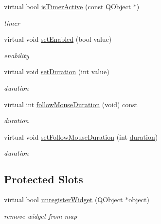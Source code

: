 \begin{DoxyCompactItemize}
virtual bool \hyperlink{class_tool_bar_engine_af5a2dccf626356ea8eb9d330dbc07467}{is\+Timer\+Active} (const Q\+Object $\ast$)
\begin{DoxyCompactList}\small\item\em timer \end{DoxyCompactList}\item 
\mbox{\label{class_tool_bar_engine_aef4318429c79f5d599f8decf6ffac98e}} 
virtual void \hyperlink{class_tool_bar_engine_aef4318429c79f5d599f8decf6ffac98e}{set\+Enabled} (bool value)
\begin{DoxyCompactList}\small\item\em enability \end{DoxyCompactList}\item 
\mbox{\label{class_tool_bar_engine_a6030eccbb0e396b4fe258be5b4b0a49f}} 
virtual void \hyperlink{class_tool_bar_engine_a6030eccbb0e396b4fe258be5b4b0a49f}{set\+Duration} (int value)
\begin{DoxyCompactList}\small\item\em duration \end{DoxyCompactList}\item 
\mbox{\label{class_tool_bar_engine_a4a3614fc5ce38e90ff90267070558657}} 
virtual int \hyperlink{class_tool_bar_engine_a4a3614fc5ce38e90ff90267070558657}{follow\+Mouse\+Duration} (void) const
\begin{DoxyCompactList}\small\item\em duration \end{DoxyCompactList}\item 
\mbox{\label{class_tool_bar_engine_a071558684d3a7bb791599dce2f6063b2}} 
virtual void \hyperlink{class_tool_bar_engine_a071558684d3a7bb791599dce2f6063b2}{set\+Follow\+Mouse\+Duration} (int \hyperlink{class_base_engine_a7edb8da9d2fd6cca19682d1d089dfa4b}{duration})
\begin{DoxyCompactList}\small\item\em duration \end{DoxyCompactList}\end{DoxyCompactItemize}
\subsection*{Protected Slots}
\begin{DoxyCompactItemize}
\item 
\mbox{\label{class_tool_bar_engine_adbc290dc205271df1ac2530cae814794}} 
virtual bool \hyperlink{class_tool_bar_engine_adbc290dc205271df1ac2530cae814794}{unregister\+Widget} (Q\+Object $\ast$object)
\begin{DoxyCompactList}\small\item\em remove widget from map \end{DoxyCompactList}\end{DoxyCompactItemize}
